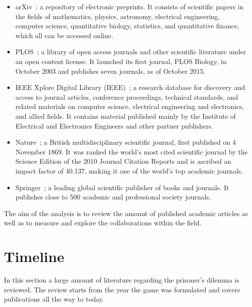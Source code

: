 \documentclass{article}
\theoremstyle{definition}
\begin{document}
\begin{multicols}{2}
    \begin{itemize}
        \item arXiv~\cite{mckiernan2000}; a repository of electronic preprints.
        It consists of scientific
        papers in the fields of mathematics, physics, astronomy, electrical engineering,
        computer science, quantitative biology, statistics, and quantitative finance,
        which all can be accessed online.
        \item PLOS~\cite{plos}; a library of open access journals and other scientific literature
        under an open content license. It launched its first journal, PLOS Biology,
        in October 2003 and publishes seven journals, as of October 2015.
        \item IEEE Xplore Digital Library (IEEE)~\cite{ieee}; a research database for discovery
        and access to journal articles, conference proceedings, technical standards,
        and related materials on computer science, electrical engineering and electronics,
        and allied fields. It contains material published mainly by the Institute of
        Electrical and Electronics Engineers and other partner publishers. 
        \item Nature~\cite{nature}; a British multidisciplinary scientific journal,
        first published on 4 November 1869. It was ranked the world's most cited
        scientific journal by the Science Edition of the 2010 Journal Citation Reports
        and is ascribed an impact factor of 40.137, making it one of the world's
        top academic journals.
        \item Springer~\cite{springer}; a leading global scientific publisher of
        books and journals. It publishes close to 500 academic and professional
        society journals.
    \end{itemize}
\end{multicols}

The aim of the analysis is to review the amount of published academic articles
as well as to measure and explore the collaborations within the field.

\section{Timeline}\label{section:timeline}

In this section a large amount of literature regarding the prisoner's
dilemma is reviewed. The review starts from the year the game was formulated
and covers publications all the way to today.
\end{document}
